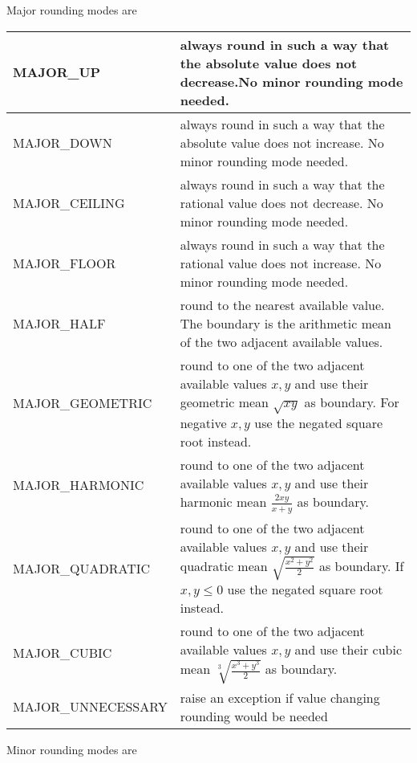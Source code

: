 \documentclass[10pt,a4paper]{article}
\begin{document}
Major rounding modes are

\begin{tabular}{|l|p{100mm}|}
\hline
  MAJOR\_UP           & always round in such a way that the absolute value does not decrease.No minor rounding mode needed.\\
\hline
  MAJOR\_DOWN         & always round in such a way that the absolute value does not increase. No minor rounding mode needed.\\
\hline
  MAJOR\_CEILING      & always round in such a way that the rational value does not decrease. No minor rounding mode needed.\\
\hline
  MAJOR\_FLOOR        & always round in such a way that the rational value does not increase. No minor rounding mode needed.\\
\hline
  MAJOR\_HALF         & round to the nearest available value.  The boundary is the arithmetic mean of the two adjacent available values.\\
\hline
  MAJOR\_GEOMETRIC    & round to one of the two adjacent available values $x,y$ and use their geometric mean $\sqrt{xy}$ as boundary.  For negative $x,y$ use the negated square root instead.\\
\hline
  MAJOR\_HARMONIC     & round to one of the two adjacent available values $x,y$ and use their harmonic mean $\frac{2xy}{x+y}$ as boundary.\\
\hline
  MAJOR\_QUADRATIC    & round to one of the two adjacent available values $x,y$ and use their quadratic mean $\sqrt{\frac{x^2+y^2}{2}}$ as boundary.  If $x,y\le 0$ use the negated square root instead.\\
\hline
  MAJOR\_CUBIC        & round to one of the two adjacent available values $x,y$ and use their cubic mean $\sqrt[3]{\frac{x^3+y^3}{2}}$ as boundary.\\
\hline
  MAJOR\_UNNECESSARY  & raise an exception if value changing rounding would be needed\\
\hline
\end{tabular}

\pagebreak

Minor rounding modes are
\end{document}
